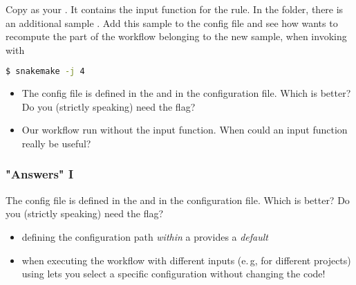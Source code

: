 \begin{frame}[fragile]
	\frametitle{}
	\begin{task}\footnotesize
		Copy  as your . It contains the input function for the  rule.
		In the  folder, there is an additional sample . Add this sample to the config file and see how \Snakemake{} wants to recompute the part of the workflow belonging to the new sample, when invoking with 
		\begin{lstlisting}[language=Bash, style=Shell]
$ snakemake -j 4 
		\end{lstlisting}
	\end{task}
    \begin{question}[Questions]
    	\footnotesize
    	\begin{itemize}
    		\item The config file is defined in the  and in the configuration file. Which is better? Do you (strictly speaking) need the  flag?
    		\item Our workflow run without the input function. When could an input function really be useful?
    	\end{itemize}
    \end{question}
\end{frame}

\begin{frame}[fragile]
	\frametitle{"Answers" I}
	\begin{question}
		The config file is defined in the  and in the configuration file. Which is better? Do you (strictly speaking) need the  flag?
	\end{question}
    \pause
    \begin{itemize}[<+->]
    	\item defining the configuration path \emph{within} a  provides a \emph{default}
    	\item when executing the workflow with different inputs (e.\,g, for different projects) using  lets you select a specific configuration without changing the code!
    \end{itemize}
\end{frame}


